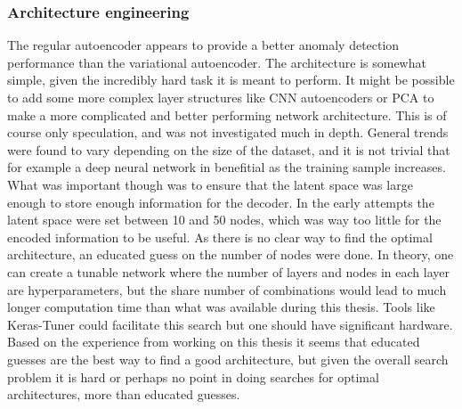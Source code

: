 \subsubsection*{Architecture engineering}
The regular autoencoder appears to provide a better anomaly detection performance than the variational autoencoder. 
The architecture is somewhat simple, given the incredibly hard task it is meant to perform. It might be possible to 
add some more complex layer structures like CNN autoencoders or PCA to make a more complicated and better performing 
network architecture. This is of course only speculation, and was not investigated much in depth. General trends were 
found to vary depending on the size of the dataset, and it is not trivial that for example a deep neural network in 
benefitial as the training sample increases. What was important though was to ensure that the latent space was large 
enough to store enough information for the decoder. In the early attempts the latent space were set between 10 and 50 
nodes, which was way too little for the encoded information to be useful. As there is no clear way to find the optimal 
architecture, an educated guess on the number of nodes were done. In theory, one can create a tunable network where 
the number of layers and nodes in each layer are hyperparameters, but the share number of combinations would lead to 
much longer computation time than what was available during this thesis. Tools like Keras-Tuner could facilitate 
this search but one should have significant hardware. Based on the experience from working on this thesis it seems 
that educated guesses are the best way to find a good architecture, but given the overall search problem it is hard 
or perhaps no point in doing searches for optimal architectures, more than educated guesses. 

